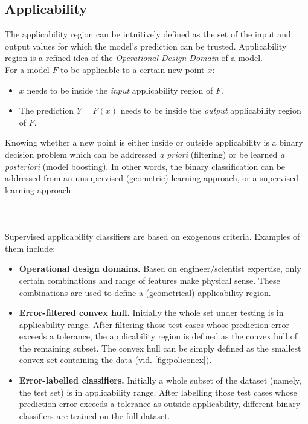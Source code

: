 \subsection{Applicability}
\indent The applicability region can be intuitively defined as the set of the input and output values for which the model's prediction can be trusted. Applicability region is a refined idea of the \textit{Operational Design Domain} of a model.\\
\indent For a model $F$ to be applicable to a certain new point $x$:
\begin{itemize}
	\item $x$ needs to be inside the \textit{input} applicability region of $F$.
	\item The prediction $Y=F(x)$ needs to be inside the \textit{output} applicability region of $F$.\\
\end{itemize}
%
\indent Knowing whether a new point is either inside or outside applicability is a binary decision problem which can be addressed \textit{a priori} (filtering) or be learned \textit{a posteriori} (model boosting). In other words, the binary classification can be addressed from an unsupervised (geometric) learning approach, or a supervised learning approach:
\paragraph{ \\}
Supervised applicability classifiers are based on exogenous criteria. Examples of them include:
\begin{itemize}
	\item \textbf{Operational design domains.} Based on engineer/scientist expertise, only certain combinations and range of features make physical sense. These combinations are used to define a (geometrical) applicability region.
	\item \textbf{Error-filtered convex hull.} Initially the whole set under testing is in applicability range. After filtering those test cases whose prediction error exceeds a tolerance, the applicability region is defined as the convex hull of the remaining subset. The convex hull can be simply defined as the smallest convex set containing the data\cite{Preparata1985} (vid. \autoref{fig:policonex}).
	\item \textbf{Error-labelled classifiers.} Initially a whole subset of the dataset (namely, the test set) is in applicability range. After labelling those test cases whose prediction error exceeds a tolerance as outside applicability, different binary classifiers are trained on the full dataset.\\
\end{itemize}

